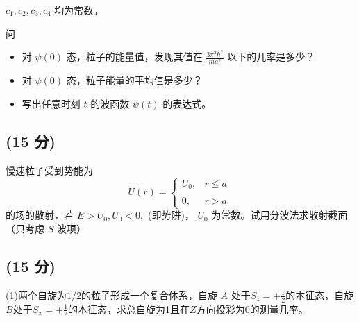 \(c_1, c_2, c_3, c_4\) 均为常数。

问\begin{itemize}
  \item  对 \( \psi (0) \) 态，粒子的能量值，发现其值在 \( \frac{3\pi^2 \hbar^2}{ma^2} \) 以下的几率是多少？
  \item  对 \( \psi (0) \) 态，粒子能量的平均值是多少？
  \item  写出任意时刻 \( t \) 的波函数 \( \psi (t) \) 的表达式。
\end{itemize}
\subsection{(15 分)}
 慢速粒子受到势能为
\[U(r) = \begin{cases} U_0, & r \leq a \\\\0, & r > a \end{cases}~\]
的场的散射，若 $E > U_0, U_0 < 0,$ (即势阱)， $U_0$ 为常数。试用分波法求散射截面（只考虑 $S$ 波项）
\subsection{(15 分)}
(1)两个自旋为$1/2$的粒子形成一个复合体系，自旋 $A$ 处于$S_z =+\frac{1}{2}$的本征态，自旋$B$处于$S_x=+\frac{1}{2}$的本征态，求总自旋为1且在$Z$方向投彩为0的测量几率。